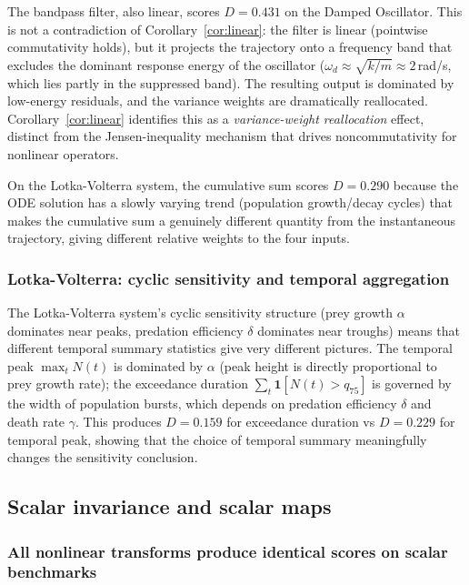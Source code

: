 \documentclass[11pt,onecolumn]{article}
\begin{document}
The bandpass filter, also linear, scores $D = 0.431$ on the Damped Oscillator.
This is not a contradiction of Corollary~\ref{cor:linear}: the filter is linear
(pointwise commutativity holds), but it projects the trajectory onto a frequency
band that excludes the dominant response energy of the oscillator
($\omega_d \approx \sqrt{k/m} \approx 2$\,rad/s, which lies partly in the
suppressed band).  The resulting output is dominated by low-energy residuals,
and the variance weights are dramatically reallocated.  Corollary~\ref{cor:linear}
identifies this as a \emph{variance-weight reallocation} effect, distinct from
the Jensen-inequality mechanism that drives noncommutativity for nonlinear operators.

On the Lotka-Volterra system, the cumulative sum scores $D = 0.290$ because
the ODE solution has a slowly varying trend (population growth/decay cycles)
that makes the cumulative sum a genuinely different quantity from the instantaneous
trajectory, giving different relative weights to the four inputs.

\subsubsection{Lotka-Volterra: cyclic sensitivity and temporal aggregation}

The Lotka-Volterra system's cyclic sensitivity structure (prey growth $\alpha$
dominates near peaks, predation efficiency $\delta$ dominates near troughs)
means that different temporal summary statistics give very different pictures.
The temporal peak $\max_t N(t)$ is dominated by $\alpha$ (peak height is
directly proportional to prey growth rate); the exceedance duration
$\sum_t \mathbf{1}[N(t) > q_{75}]$ is governed by the width of population
bursts, which depends on predation efficiency $\delta$ and death rate $\gamma$.
This produces $D = 0.159$ for exceedance duration vs $D = 0.229$ for temporal
peak, showing that the choice of temporal summary meaningfully changes the
sensitivity conclusion.

\subsection{Scalar invariance and scalar maps}
\label{sec:scalar_results}

\subsubsection{All nonlinear transforms produce identical scores on scalar benchmarks}
\end{document}
